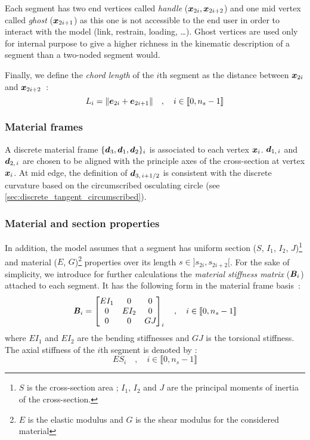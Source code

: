 Each segment has two end vertices called \emph{handle} ($\boldsymbol{x}_{2i}, \boldsymbol{x}_{2i+2}$) and one mid vertex called \emph{ghost} ($\boldsymbol{x}_{2i+1}$) as this one is not accessible to the end user in order to interact with the model (link, restrain, loading, \dots). Ghost vertices are used only for internal purpose to give a higher richness in the kinematic description of a segment than a two-noded segment would.

Finally, we define the \emph{chord length} of the $i$th segment as the distance between $\boldsymbol{x}_{2i}$ and $\boldsymbol{x}_{2i+2}$~:
\begin{equation}
	L_i = \lVert\boldsymbol{e}_{2i} + \boldsymbol{e}_{2i+1}\rVert \quad , \quad i \in \llbracket 0, n_s-1 \rrbracket
\end{equation}

\subsubsection{Material frames}
A discrete material frame $\{\boldsymbol{d}_{3}, \boldsymbol{d}_{1}, \boldsymbol{d}_{2}\}_i$ is associated to each vertex $\boldsymbol{x}_i$. $\boldsymbol{d}_{1,\,i}$ and $\boldsymbol{d}_{2,\,i}$ are chosen to be aligned with the principle axes of the cross-section at vertex $\boldsymbol{x}_i$. At mid edge, the definition of $\boldsymbol{d}_{3,\,i+1/2}$ is consistent with the discrete curvature based on the circumscribed osculating circle (see \cref{sec:discrete_tangent_circumscribed}).

\subsubsection{Material and section properties}
In addition, the model assumes that a segment has uniform section ($S$, $I_1$, $I_2$, $J$)\footnote{$S$ is the cross-section area ; $I_1$, $I_2$ and $J$ are the principal moments of inertia of the cross-section.} and material ($E$, $G$)\footnote{$E$ is the elastic modulus and $G$ is the shear  modulus for the considered material} properties over its length $s \in ]s_{2i},s_{2i+2}[$. For the sake of simplicity, we introduce for further calculations the \emph{material stiffness matrix} ($\boldsymbol{\mathit{B}}_i$) attached to each segment. It has the following form in the material frame basis~:
\begin{equation}
	\boldsymbol{\mathit{B}}_i = \begin{bmatrix} 
			EI_1		&	0		&	0		\\
			0		&	EI_{2}	&	0		\\
			0		&	0		&	GJ_{}	\\
		\end{bmatrix}_i
	\quad , \quad i \in \llbracket 0, n_s-1 \rrbracket
	\label{eq:stiffnessmatrix}
\end{equation}
where $EI_1$ and $EI_2$ are the bending stiffnesses and $GJ$ is the torsional stiffness. The axial stiffness of the $i$th segment is denoted by :
\begin{equation}
	ES_i 	\quad , \quad i \in \llbracket 0, n_s-1 \rrbracket
\end{equation}

